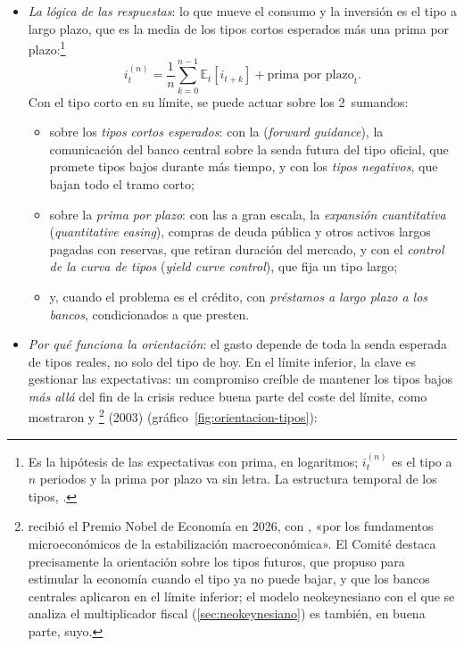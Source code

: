\documentclass[11pt]{article}
\begin{document}
\begin{itemize}
\item \emph{La lógica de las respuestas}: lo que mueve el consumo y la inversión es el tipo a largo plazo, que es la media de los tipos cortos esperados más una prima por plazo:\footnote{Es la hipótesis de las expectativas con prima, en logaritmos; $i^{(n)}_t$ es el tipo a $n$ periodos y la prima por plazo va sin letra. La estructura temporal de los tipos, .}
  \begin{equation}
  i^{(n)}_t=\frac{1}{n}\sum_{k=0}^{n-1}\mathbb{E}_t[i_{t+k}]+\text{prima por plazo}_t . \label{eq:tipo-largo}
  \end{equation}
  Con el tipo corto en su límite, se puede actuar sobre los 2~sumandos:
  \begin{itemize}
  \item sobre los \emph{tipos cortos esperados}: con la  (\emph{forward guidance}), la comunicación del banco central sobre la senda futura del tipo oficial, que promete tipos bajos durante más tiempo, y con los \emph{tipos negativos}, que bajan todo el tramo corto;
  \item sobre la \emph{prima por plazo}: con las  a gran escala, la \emph{expansión cuantitativa} (\emph{quantitative easing}), compras de deuda pública y otros activos largos pagadas con reservas, que retiran duración del mercado, y con el \emph{control de la curva de tipos} (\emph{yield curve control}), que fija un tipo largo;
  \item y, cuando el problema es el crédito, con \emph{préstamos a largo plazo a los bancos}, condicionados a que presten.
  \end{itemize}
\item \emph{Por qué funciona la orientación}: el gasto depende de toda la senda esperada de tipos reales, no solo del tipo de hoy. En el límite inferior, la clave es gestionar las expectativas: un compromiso creíble de mantener los tipos bajos \emph{más allá} del fin de la crisis reduce buena parte del coste del límite, como mostraron  y \footnote{ recibió el Premio Nobel de Economía en 2026, con , «por los fundamentos microeconómicos de la estabilización macroeconómica»\nocite{Nobel2026Prensa}. El Comité destaca precisamente la orientación sobre los tipos futuros, que  propuso para estimular la economía cuando el tipo ya no puede bajar, y que los bancos centrales aplicaron en el límite inferior\nocite{Nobel2026Cientifico}; el modelo neokeynesiano con el que se analiza el multiplicador fiscal (\ref{sec:neokeynesiano}) es también, en buena parte, suyo.} (2003)\nocite{EggertssonWoodford2003Zero} (gráfico~\ref{fig:orientacion-tipos}):

\end{itemize}
\end{document}
